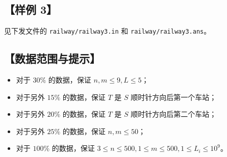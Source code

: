 \documentclass[11pt,a4paper,oneside]{article}
\begin{document}
\subsection*{【样例 3】}

见下发文件的 \texttt{railway/railway3.in} 和 \texttt{railway/railway3.ans}。

\subsection*{【数据范围与提示】}

\begin{itemize}
  \item 对于 $30\%$ 的数据，保证 $n,m \le 9,L \le 5$；
  \item 对于另外 $15\%$ 的数据，保证 $T$ 是 $S$ 顺时针方向后第一个车站；
  \item 对于另外 $20\%$ 的数据，保证 $T$ 是 $S$ 顺时针方向后第二个车站；
  \item 对于另外 $25\%$ 的数据，保证 $n,m \le 50$；
  \item 对于 $100\%$ 的数据，保证 $3 \le n \le 500,1 \le m \le 500,1 \le L_i \le 10^9$。
\end{itemize}
\end{document}
